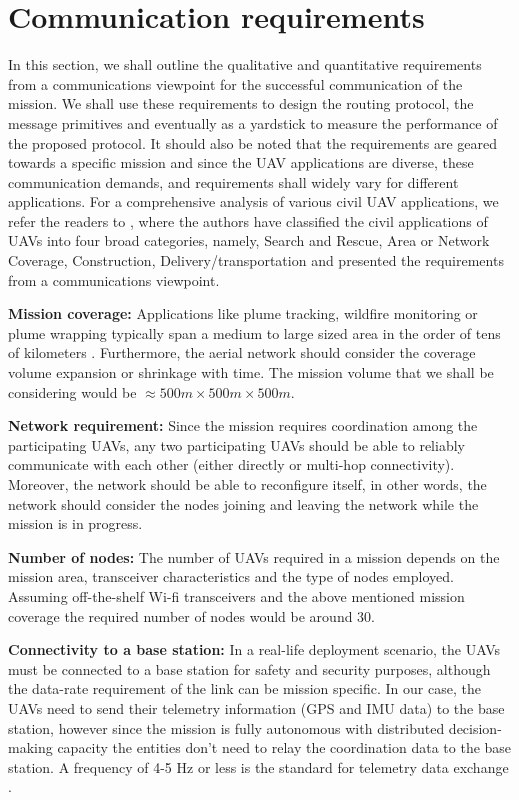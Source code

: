 \section{Communication requirements} \label{comm_reqs}

In this section, we shall outline the qualitative and quantitative requirements from a communications viewpoint for the successful communication of the mission. We shall use these requirements to design the routing protocol, the message primitives and eventually as a yardstick to measure the performance of the proposed protocol. It should also be noted that the requirements are geared towards a specific mission and since the UAV applications are diverse, these communication demands, and requirements shall widely vary for different applications. For a comprehensive analysis of various civil UAV applications, we refer the readers to \cite{7463007}, where the authors have classified the civil applications of UAVs into four broad categories, namely, Search and Rescue, Area or Network Coverage, Construction, Delivery/transportation and presented the requirements from a communications viewpoint. 

\textbf{Mission coverage:} Applications like plume tracking, wildfire monitoring or plume wrapping typically span a medium to large sized area in the order of tens of kilometers \cite{7463007}. Furthermore, the aerial network should consider the coverage volume expansion or shrinkage with time. The mission volume that we shall be considering would be $ \approx 500 m \times 500 m \times 500 m $. 

\textbf{Network requirement:} Since the mission requires coordination among the participating UAVs, any two participating UAVs should be able to reliably communicate with each other (either directly or multi-hop connectivity). Moreover, the network should be able to reconfigure itself, in other words, the network should consider the nodes joining and leaving the network while the mission is in progress.

\textbf{Number of nodes:} The number of UAVs required in a mission depends on the mission area, transceiver characteristics and the type of nodes employed. Assuming off-the-shelf Wi-fi transceivers and the above mentioned mission coverage the required number of nodes would be around 30. 

\textbf{Connectivity to a base station:} In a real-life deployment scenario, the UAVs must be connected to a base station for safety and security purposes, although the data-rate requirement of the link can be mission specific. In our case, the UAVs need to send their telemetry information (GPS and IMU data) to the base station, however since the mission is fully autonomous with distributed decision-making capacity the entities don't need to relay the coordination data to the base station. A frequency of 4-5 Hz or less is the standard for telemetry data exchange \cite{7463007}. 

